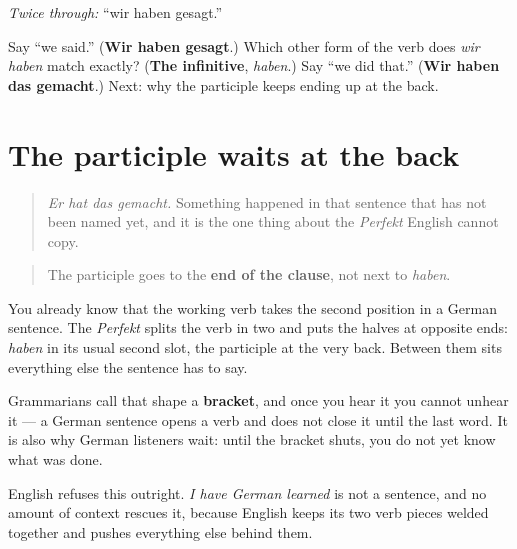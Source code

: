 \emph{Twice through:} \textquotedblleft{}wir haben gesagt.\textquotedblright{}

\begin{tcolorbox}[breakable,colback=teal!4,colframe=teal!35!black,title={Before you move on}]
Say \textquotedblleft{}we said.\textquotedblright{} (\textbf{Wir haben gesagt}.) Which other form of the verb does \emph{wir haben} match exactly? (\textbf{The infinitive}, \emph{haben}.) Say \textquotedblleft{}we did that.\textquotedblright{} (\textbf{Wir haben das gemacht}.) Next: why the participle keeps ending up at the back.
\end{tcolorbox}
\section[das Partizip am Ende]{The participle waits at the back}

\label{lesson:GE-C15-partizip-am-ende}



\begin{quote}
\emph{Er hat das gemacht.} Something happened in that sentence that has not been named yet, and it is the one thing about the \emph{Perfekt} English cannot copy.
\end{quote}

\begin{grammarlens}[title={Grammar Lens: where the participle goes}]
\begin{quote}
The participle goes to the \textbf{end of the clause}, not next to \emph{haben}.
\end{quote}

You already know that the working verb takes the second position in a German sentence. The \emph{Perfekt} splits the verb in two and puts the halves at opposite ends: \emph{haben} in its usual second slot, the participle at the very back. Between them sits everything else the sentence has to say.

Grammarians call that shape a \textbf{bracket}, and once you hear it you cannot unhear it — a German sentence opens a verb and does not close it until the last word. It is also why German listeners wait: until the bracket shuts, you do not yet know what was done.

English refuses this outright. \emph{I have German learned} is not a sentence, and no amount of context rescues it, because English keeps its two verb pieces welded together and pushes everything else behind them.
\end{grammarlens}


